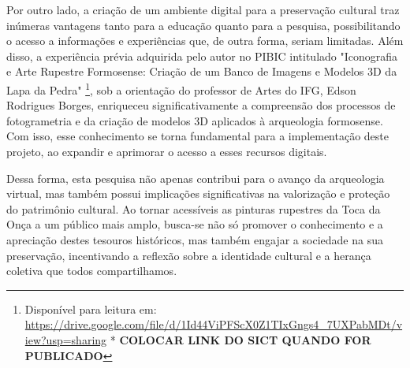 Por outro lado, a criação de um ambiente digital para a preservação cultural traz inúmeras vantagens tanto para a educação quanto para a pesquisa, possibilitando o acesso a informações e experiências que, de outra forma, seriam limitadas. Além disso, a experiência prévia adquirida pelo autor no \gls{PIBIC} intitulado "Iconografia e Arte Rupestre Formosense: Criação de um Banco de Imagens e Modelos \gls{3D} da Lapa da Pedra" \footnote{Disponível para leitura em: 
\href{https://drive.google.com/file/d/1Id44ViPFScX0Z1TIxGngs4_7UXPabMDt/view?usp=sharing}{https://drive.google.com/file/d/1Id44ViPFScX0Z1TIxGngs4_7UXPabMDt/view?usp=sharing} *\textbf{ COLOCAR LINK DO SICT QUANDO FOR PUBLICADO}}, sob a orientação do professor de Artes do \gls{IFG}, Edson Rodrigues Borges, enriqueceu significativamente a compreensão dos processos de fotogrametria e da criação de modelos \gls{3D} aplicados à arqueologia formosense. Com isso, esse conhecimento se torna fundamental para a implementação deste projeto, ao expandir e aprimorar o acesso a esses recursos digitais.

Dessa forma, esta pesquisa não apenas contribui para o avanço da arqueologia virtual, mas também possui implicações significativas na valorização e proteção do patrimônio cultural. Ao tornar acessíveis as pinturas rupestres da Toca da Onça a um público mais amplo, busca-se não só promover o conhecimento e a apreciação destes tesouros históricos, mas também engajar a sociedade na sua preservação, incentivando a reflexão sobre a identidade cultural e a herança coletiva que todos compartilhamos.

